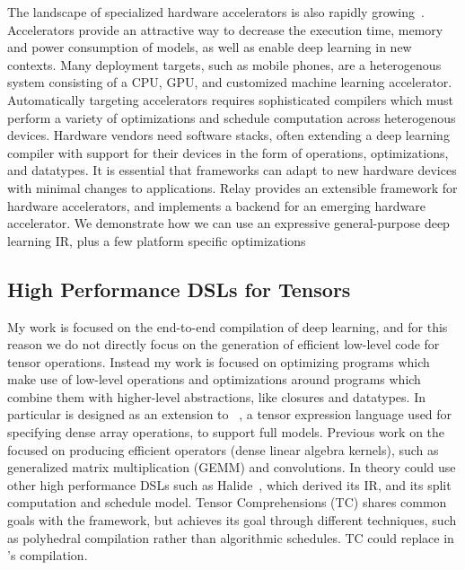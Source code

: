 The landscape of specialized hardware
  accelerators is also rapidly growing~\cite{
    moreau2018vta, OpenTPU, tpuv1}.
Accelerators provide an attractive way to decrease
  the execution time, memory and power consumption of models, as well
  as enable deep learning in new contexts.
Many deployment targets, such as mobile phones, are a heterogenous system
  consisting of a CPU, GPU, and customized machine learning accelerator.
Automatically targeting accelerators requires sophisticated compilers which
  must perform a variety of optimizations and schedule computation across
  heterogenous devices.
Hardware vendors need software stacks, often extending a deep learning
  compiler with support for their devices in the form of operations,
  optimizations, and datatypes.
It is essential that frameworks can adapt to new hardware devices
  with minimal changes to applications.
Relay provides an extensible framework for hardware accelerators,
  and implements a backend for \vta an emerging hardware accelerator\cite{moreau2018vta}.
We demonstrate how we can use an expressive general-purpose deep learning IR, plus
  a few platform specific optimizations

\subsection{High Performance DSLs for Tensors}

My work is focused on the end-to-end compilation of deep learning, and for
  this reason we do not directly focus on the generation of efficient low-level code for
  tensor operations.
Instead my work is focused on optimizing programs which make use of low-level operations
  and optimizations around programs which combine them with higher-level abstractions,
  like closures and datatypes.
In particular \relay is designed as an extension to \tvm~\cite{tvm_osdi18},
  a tensor expression language used for specifying dense array
  operations, to support full models.
Previous work on the \tvm focused on producing efficient operators
  (dense linear algebra kernels), such as generalized matrix multiplication (GEMM) and convolutions.
In theory \relay could use other high performance DSLs such as Halide~\cite{halide},
    which \tvm derived its IR, and its split computation and schedule model.
Tensor Comprehensions (TC) shares common goals with the \tvm framework, but achieves its goal
through different techniques, such as polyhedral compilation rather than algorithmic
schedules. TC could replace \tvm in \relay{}'s compilation.


